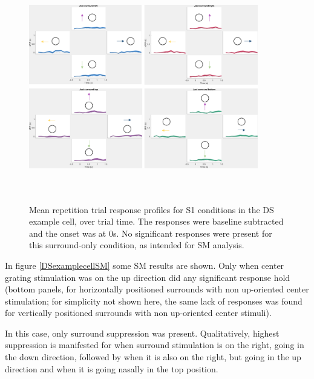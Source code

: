 \begin{figure}[H] \centering \includegraphics[width=10cm,height=10cm,keepaspectratio]{Figures/7.Results/individualSM/roi_29_mf379_pos5/justsurrscol.png} 
\caption{Mean repetition trial response profiles for S1 conditions in the DS example cell, over trial time. The responses were baseline subtracted and the onset was at 0s. No significant responses were present for this surround-only condition, as intended for SM analysis.
\label{DSexamplecellsurrounds}}
\end{figure}

In figure \ref{DSexamplecellSM} some SM results are shown. Only when center grating stimulation was on the up direction did any significant response hold (bottom panels, for horizontally positioned surrounds with non up-oriented center stimulation; for simplicity not shown here, the same lack of responses was found for vertically positioned surrounds with non up-oriented center stimuli).

In this case, only surround suppression was present. Qualitatively, highest suppression is manifested for when surround stimulation is on the right, going in the down direction, followed by when it is also on the right, but going in the up direction and when it is going nasally in the top position.

